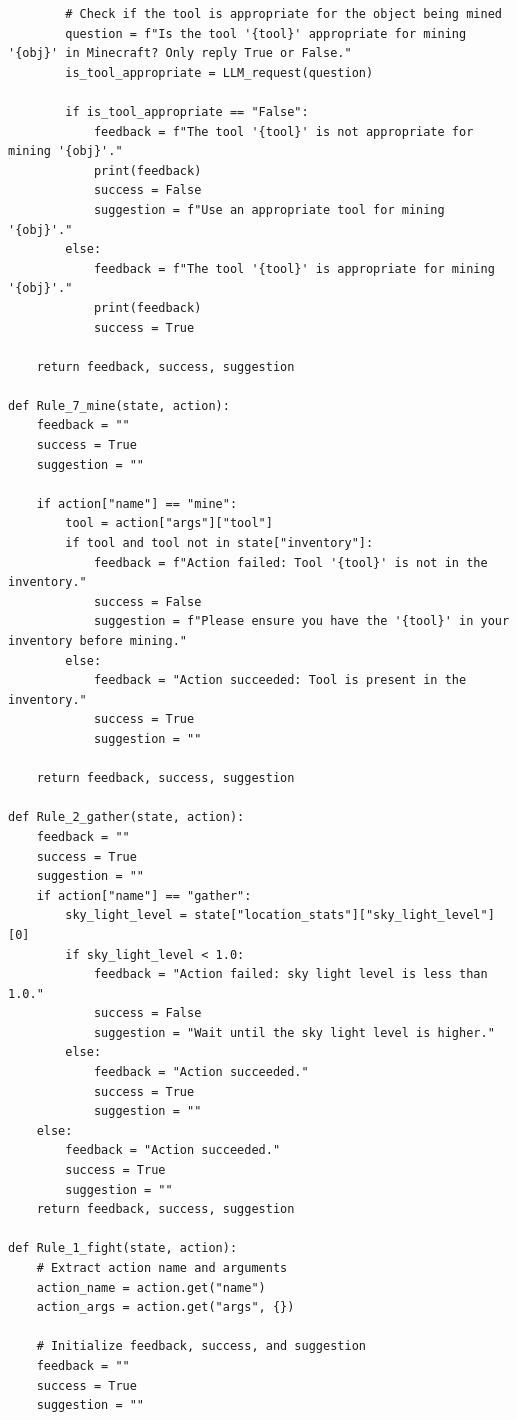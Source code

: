 \documentclass{article} %
\begin{document}
\begin{lstlisting}
        # Check if the tool is appropriate for the object being mined
        question = f"Is the tool '{tool}' appropriate for mining '{obj}' in Minecraft? Only reply True or False."
        is_tool_appropriate = LLM_request(question)

        if is_tool_appropriate == "False":
            feedback = f"The tool '{tool}' is not appropriate for mining '{obj}'."
            print(feedback)
            success = False
            suggestion = f"Use an appropriate tool for mining '{obj}'."
        else:
            feedback = f"The tool '{tool}' is appropriate for mining '{obj}'."
            print(feedback)
            success = True

    return feedback, success, suggestion

def Rule_7_mine(state, action):
    feedback = ""
    success = True
    suggestion = ""

    if action["name"] == "mine":
        tool = action["args"]["tool"]
        if tool and tool not in state["inventory"]:
            feedback = f"Action failed: Tool '{tool}' is not in the inventory."
            success = False
            suggestion = f"Please ensure you have the '{tool}' in your inventory before mining."
        else:
            feedback = "Action succeeded: Tool is present in the inventory."
            success = True
            suggestion = ""

    return feedback, success, suggestion

def Rule_2_gather(state, action):
    feedback = ""
    success = True
    suggestion = ""
    if action["name"] == "gather":
        sky_light_level = state["location_stats"]["sky_light_level"][0]
        if sky_light_level < 1.0:
            feedback = "Action failed: sky light level is less than 1.0."
            success = False
            suggestion = "Wait until the sky light level is higher."
        else:
            feedback = "Action succeeded."
            success = True
            suggestion = ""
    else:
        feedback = "Action succeeded."
        success = True
        suggestion = ""
    return feedback, success, suggestion
    
def Rule_1_fight(state, action):
    # Extract action name and arguments
    action_name = action.get("name")
    action_args = action.get("args", {})
    
    # Initialize feedback, success, and suggestion
    feedback = ""
    success = True
    suggestion = ""
    

\end{lstlisting}
\end{document}
